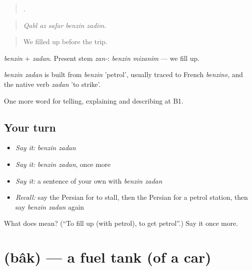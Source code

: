 \begin{quote}
    .
\end{quote}

\begin{quote}
\emph{Qabl az safar benzin zadim.}
\end{quote}

\begin{quote}
We filled up before the trip.
\end{quote}

\emph{benzin} + \emph{zadan}. Present stem \emph{zan-}: \emph{benzin mizanim} — we fill up.

\begin{cousinweb}
\emph{benzin zadan} is built from \emph{benzin} 'petrol', usually traced to French \emph{benzine}, and the native verb \emph{zadan} 'to strike'.
\end{cousinweb}

\begin{grammarlens}[title={What you've built}]
One more word for telling, explaining and describing at B1.
\end{grammarlens}

\subsection*{Your turn}
\begin{itemize}
\raggedright
  \item \emph{Say it:} \emph{benzin zadan}
  \item \emph{Say it:} \emph{benzin zadan}, once more
  \item \emph{Say it:} a sentence of your own with \emph{benzin zadan}
  \item \emph{Recall:} say the Persian for to stall, then the Persian for a petrol station, then say \emph{benzin zadan} again
\end{itemize}

\begin{tcolorbox}[breakable,colback=teal!4,colframe=teal!35!black,title={Before you move on}]
What does   mean? (\textquotedblleft{}To fill up (with petrol), to get petrol\textquotedblright{}.) Say it once more.
\end{tcolorbox}
\section[\texorpdfstring{\fa{باک} (bâk)}{باک (bâk)}]{ (bâk) — a fuel tank (of a car)}


